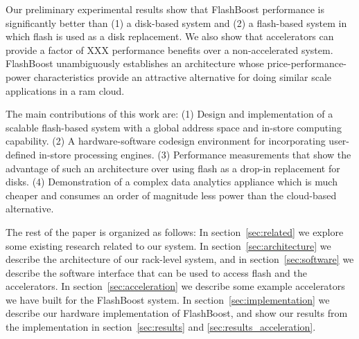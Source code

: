 Our preliminary experimental results show that FlashBoost performance is
significantly better than (1) a disk-based system and (2) a flash-based system
in which flash is used as a disk replacement. We also show that accelerators can
provide a factor of XXX performance benefits over a non-accelerated system.
FlashBoost unambiguously establishes an architecture whose
price-performance-power characteristics provide an attractive alternative for
doing similar scale applications in a ram cloud.

The main contributions of this work are: (1) Design and implementation of a
scalable flash-based system with a global address space and in-store computing
capability. (2) A hardware-software codesign environment for incorporating
user-defined in-store processing engines. (3) Performance measurements that show
the advantage of such an architecture over using flash as a drop-in replacement
for disks. (4) Demonstration of a complex data analytics appliance which is much
cheaper and consumes an order of magnitude less power than the cloud-based
alternative.

The rest of the paper is organized as follows: In section~\ref{sec:related} we
explore some existing research related to our system. In
section~\ref{sec:architecture} we describe the architecture of our rack-level
system, and in section~\ref{sec:software} we describe the software interface
that can be used to access flash and the accelerators. In
section~\ref{sec:acceleration} we describe some example accelerators we have
built for the FlashBoost system. In section~\ref{sec:implementation} we describe
our hardware implementation of FlashBoost, and show our results from the
implementation in section~\ref{sec:results} and \ref{sec:results_acceleration}.
